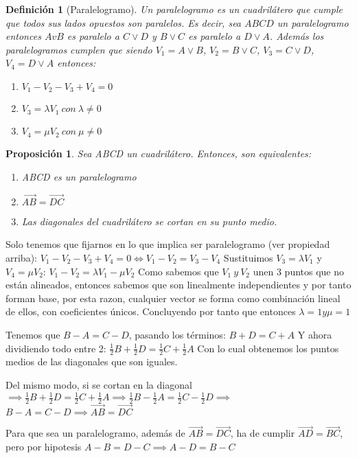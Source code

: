 \documentclass[11pt, a4paper, titlepage]{article}
\makeatletter
\renewenvironment{proof}[1][\proofname] {\vspace{-15pt}\par\pushQED{\qed}\normalfont\topsep6\p@\@plus6\p@\relax\trivlist\item[\hskip\labelsep\it#1\@addpunct{.}]\ignorespaces}{\popQED\endtrivlist\@endpefalse}
\theoremstyle{theorem-style}
\newtheorem*{nprop}{Proposición}
\theoremstyle{definition-style}
\newtheorem*{ndef}{Definición}
\theoremstyle{remark-style}
\theoremstyle{example-style}
\newenvironment{nlist}
{\begin{enumerate}
\renewcommand\labelenumi{(\emph{\roman{enumi})}}}
{\end{enumerate}}
\makeatother
\begin{document}
\begin{ndef}[Paralelogramo]
	Un paralelogramo es un cuadrilátero que cumple que todos sus lados opuestos son paralelos. Es decir, sea $ABCD$ un
	paralelogramo entonces $AvB$ es paralelo a $C \vee D$ y $B \vee C$ es paralelo a $D \vee A$. Además los paralelogramos cumplen que
	siendo $V_{1} = A \vee B$, $V_{2} = B \vee C$, $V_{3} = C\vee D$, $V_{4} = D \vee A$ entonces:
	\begin{nlist}
		\item $V_{1} - V_{2} - V_{3} + V_{4} = 0$
		\item $V_{3} = \lambda V_{1}\ con\ \lambda \neq 0$
		\item $V_{4} = \mu V_{2}\ con\ \mu \neq 0$
	\end{nlist}
\end{ndef}


\begin{nprop}
	Sea ABCD un cuadrilátero. Entonces, son equivalentes:
	\begin{nlist}
		\item ABCD es un paralelogramo
		\item $\vec{AB} = \vec{DC}$
		\item Las diagonales del cuadrilátero se cortan en su punto medio.
	\end{nlist}
\end{nprop}


\begin{proof}\hfill
	Solo tenemos que fijarnos en lo que implica ser paralelogramo (ver propiedad arriba):
	$V_{1} - V_{2} - V_{3} + V_{4} = 0 \Leftrightarrow V_{1} - V_{2} = V_{3} - V_{4} $
	Sustituimos $V_{3} = \lambda V_{1}$ y $V_{4} = \mu V_{2}$:
	$V_{1} - V_{2} = \lambda V_{1} - \mu V_{2}$
	Como sabemos que $V_{1}\ y\ V_{2}$ unen 3 puntos que no están alineados, entonces sabemos que son linealmente independientes y por
	tanto forman base, por esta razon, cualquier vector se forma como combinación lineal de ellos, con coeficientes únicos.
	Concluyendo por tanto que entonces $\lambda = 1 y \mu = 1$

	Tenemos que $B - A = C - D$, pasando los términos:
	$B + D = C + A$
	Y ahora dividiendo todo entre 2:
	$\frac{1}{2}B + \frac{1}{2}D = \frac{1}{2}C + \frac{1}{2}A$
	Con lo cual obtenemos los puntos medios de las diagonales que son iguales.

	 Del mismo modo, si se cortan en la diagonal 
	$\implies \frac{1}{2}B + \frac{1}{2}D = \frac{1}{2}C + \frac{1}{2}A \implies 
	\frac{1}{2}B - \frac{1}{2}A = \frac{1}{2}C - \frac{1}{2}D \implies $ $B - A = C - D \implies \vec{AB} = \vec{DC}$
	
	 Para que sea un paralelogramo, además de $\vec{AB} = \vec{DC}$, ha de cumplir $\vec{AD} = \vec{BC}$, pero por hipotesis $A - B = D - C \implies A - D = B - C$

	
	
\end{proof}
\end{document}

